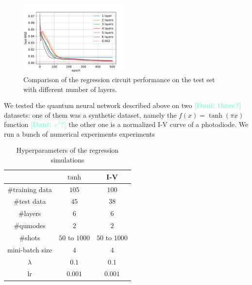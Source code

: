 \documentclass[12pt, a4paper,  nobibnotes]{article}
\newcommand{\nd}[1]{\textcolor{Aquamarine}{\textbf{[Dani: #1]}}}
\begin{document}
\begin{figure}[H]
    \centering
    \includegraphics[width=0.5\textwidth]{figures/tanh-test-mse-lr=0_001-bs=150-layersearch.pdf}
    \caption{Comparison of the regression circuit performance on the test set
    with different number of layers.}
    \label{fig:tanh_layer_search}
\end{figure}

We tested the quantum neural network described above on two \nd{three?} datasets: one of them was a
synthetic dataset, namely the $f(x)=\tanh(\pi x)$ function \nd{$x^3$?} the other one is a normalized
I-V curve of a photodiode.
We run a bunch of numerical experiments experiments

\begin{table}[H]
    \centering
    \begin{tabular}{|c|c|c| } 
     \hline
     &  $\tanh$ & I-V \\ \hline
     \#training data & $105$ & $100$\\ \hline 
     \#test data & $45$ & $38$\\ \hline 
     \#layers & $6 $& $6$ \\ \hline
     \#qumodes & $2$ & $2$ \\ \hline
     \#shots & $50$ to $1000$ & $50$ to $1000$ \\ \hline
     mini-batch size & $4$ & $4$ \\ \hline
     $\lambda$ & $0.1$ & $0.1$ \\ \hline
     lr & $0.001$ & $0.001$ \\ \hline
     \hline
    
    \end{tabular}
    \caption{Hyperparameters of the regression simulations}
    \label{tab:hyperparams-regression}
\end{table}
\end{document}
